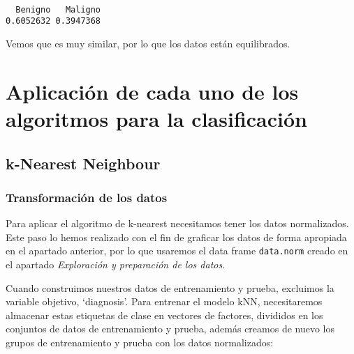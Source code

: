 \documentclass[
]{article}
\newenvironment{Shaded}{\begin{snugshade}}{\end{snugshade}}
\newcommand{\KeywordTok}[1]{\textcolor[rgb]{0.13,0.29,0.53}{\textbf{#1}}}
\newcommand{\NormalTok}[1]{#1}
\newcommand{\OperatorTok}[1]{\textcolor[rgb]{0.81,0.36,0.00}{\textbf{#1}}}
\begin{document}
\begin{Shaded}
\end{Shaded}

\begin{verbatim}

  Benigno   Maligno 
0.6052632 0.3947368 
\end{verbatim}

Vemos que es muy similar, por lo que los datos están equilibrados.

\hypertarget{aplicaciuxf3n-de-cada-uno-de-los-algoritmos-para-la-clasificaciuxf3n}{%
\section{Aplicación de cada uno de los algoritmos para la
clasificación}\label{aplicaciuxf3n-de-cada-uno-de-los-algoritmos-para-la-clasificaciuxf3n}}

\hypertarget{k-nearest-neighbour}{%
\subsection{k-Nearest Neighbour}\label{k-nearest-neighbour}}

\hypertarget{transformaciuxf3n-de-los-datos}{%
\subsubsection{Transformación de los
datos}\label{transformaciuxf3n-de-los-datos}}

Para aplicar el algoritmo de k-nearest necesitamos tener los datos
normalizados. Este paso lo hemos realizado con el fin de graficar los
datos de forma apropiada en el apartado anterior, por lo que usaremos el
data frame \texttt{data.norm} creado en el apartado \emph{Exploración y
preparación de los datos}.

Cuando construimos nuestros datos de entrenamiento y prueba, excluimos
la variable objetivo, `diagnosis'. Para entrenar el modelo kNN,
necesitaremos almacenar estas etiquetas de clase en vectores de
factores, divididos en los conjuntos de datos de entrenamiento y prueba,
además creamos de nuevo los grupos de entrenamiento y prueba con los
datos normalizados:
\end{document}
